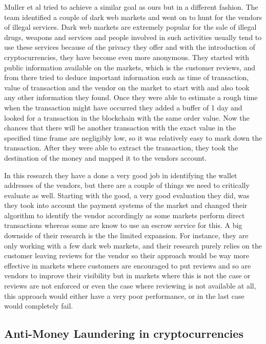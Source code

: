 \documentclass{article}
\begin{document}
        Muller et al\cite{muller} tried to achieve a similar goal as ours but in a different fashion. The team identified a couple of dark web markets and went on to hunt for the vendors of illegal services. Dark web markets are extremely popular for the sale of illegal drugs, weapons and services and people involved in such activities usually tend to use these services because of the privacy they offer and with the introduction of cryptocurrencies, they have become even more anonymous. They started with public information available on the markets, which is the customer reviews, and from there tried to deduce important information such as time of transaction, value of transaction and the vendor on the market to start with and also took any other information they found. Once they were able to estimate a rough time when the transaction might have occurred they added a buffer of 1 day and looked for a transaction in the blockchain with the same order value. Now the chances that there will be another transaction with the exact value in the specified time frame are negligibly low, so it was relatively easy to mark down the transaction. After they were able to extract the transaction, they took the destination of the money and mapped it to the vendors account.

        In this research they have a done a very good job in identifying the wallet addresses of the vendors, but there are a couple of things we need to critically evaluate as well. Starting with the good, a very good evaluation they did, was they took into account the payment systems of the market and changed their algorithm to identify the vendor accordingly as some markets perform direct transactions whereas some are know to use an escrow service \cite{Fig} for this. A big downside of their research is the the limited expansion. For instance, they are only working with a few dark web markets, and their research purely relies on the customer leaving reviews for the vendor so their approach would be way more effective in markets where customers are encouraged to put reviews and so are vendors to improve their visibility but in markets where this is not the case or reviews are not enforced or even the case where reviewing is not available at all, this approach would either have a very poor performance, or in the last case would completely fail. 

\pagebreak

    \subsection{Anti-Money Laundering in cryptocurrencies}
\end{document}
